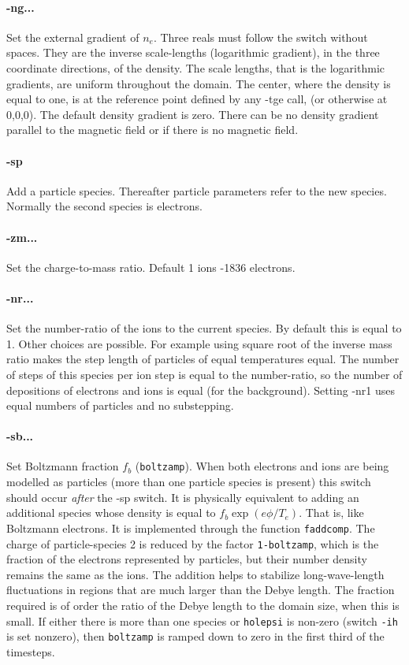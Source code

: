 \documentclass[12pt]{article}
\begin{document}
\paragraph{-ng...} Set the external gradient of $n_e$. Three reals
must follow the switch without spaces. They are the inverse
scale-lengths (logarithmic gradient), in the three coordinate
directions, of the density. The scale lengths, that is the
logarithmic gradients, are uniform throughout the domain. The center,
where the density is equal to one, is at the reference point defined
by any -tge call, (or otherwise at 0,0,0). The default density gradient is zero. There can be
no density gradient parallel to the magnetic field or if there is no
magnetic field.

\paragraph{-sp} Add a particle species. Thereafter particle parameters
refer to the new species. Normally the second species is electrons.

\paragraph{-zm...} Set the charge-to-mass ratio. Default 1 ions -1836
electrons.

\paragraph{-nr...} Set the number-ratio of the ions to the current
species. By default this is equal to 1. Other choices are
possible. For example using square root of the inverse mass ratio
makes the step length of particles of equal temperatures equal. The
number of steps of this species per ion step is equal to the
number-ratio, so the number of depositions of electrons and ions is
equal (for the background).  Setting -nr1 uses equal numbers of
particles and no substepping.

\paragraph{-sb...} Set Boltzmann fraction $f_b$
(\verb!boltzamp!). When both electrons and ions are being modelled as
particles (more than one particle species is present) this switch
should occur \emph{after} the -sp switch. It is physically equivalent
to adding an additional species whose density is equal to
$f_b\exp(e\phi/T_e)$. That is, like Boltzmann electrons.  It is
implemented through the function \verb!faddcomp!. The charge of
particle-species 2 is reduced by the factor \verb!1-boltzamp!, which is
the fraction of the electrons represented by particles, but their
number density remains the same as the ions.  The addition helps to stabilize
long-wave-length fluctuations in regions that are much larger than the
Debye length. The fraction required is of order the ratio of the Debye
length to the domain size, when this is small. If either there is more
than one species or \verb!holepsi! is non-zero (switch \verb!-ih! is
set nonzero), then \verb!boltzamp! is ramped down to zero in the first
third of the timesteps.
\end{document}
